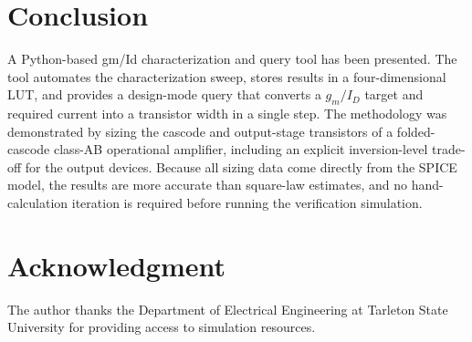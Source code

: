 \documentclass[conference]{IEEEtran}
\begin{document}
\section{Conclusion}
\label{sec:conclusion}

A Python-based gm/Id characterization and query tool has been presented.
The tool automates the characterization sweep, stores results in a
four-dimensional LUT, and provides a design-mode query that converts a
$g_m/I_D$ target and required current into a transistor width in a single
step.  The methodology was demonstrated by sizing the cascode and output-stage
transistors of a folded-cascode class-AB operational amplifier, including
an explicit inversion-level trade-off for the output devices.  Because all
sizing data come directly from the SPICE model, the results are more accurate
than square-law estimates, and no hand-calculation iteration is required
before running the verification simulation.

\section*{Acknowledgment}

The author thanks the Department of Electrical Engineering at Tarleton State
University for providing access to simulation resources.



\end{document}
